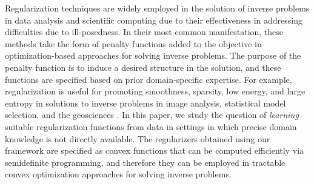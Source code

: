 \documentclass[11pt,letterpaper]{article}
\begin{document}
%
%
%
%
%

Regularization techniques are widely employed in the solution of inverse problems in data analysis and scientific computing due to their effectiveness in addressing difficulties due to ill-posedness.  In their most common manifestation, these methods take the form of penalty functions added to the objective in optimization-based approaches for solving inverse problems.  The purpose of the penalty function is to induce a desired structure in the solution, and these functions are specified based on prior domain-specific expertise.  For example, regularization is useful for promoting smoothness, sparsity, low energy, and large entropy in solutions to inverse problems in image analysis, statistical model selection, and the geosciences \cite{BDE:09,CanRec:09,CRT:06,CRPW:12,CDS:98,Don:06,MeiBuh:06,RFP:10,Tib:94}.  In this paper, we study the question of \emph{learning} suitable regularization functions from data in settings in which precise domain knowledge is not directly available.  The regularizers obtained using our framework are specified as convex functions that can be computed efficiently via semidefinite programming, and therefore they can be employed in tractable convex optimization approaches for solving inverse problems.
\end{document}
